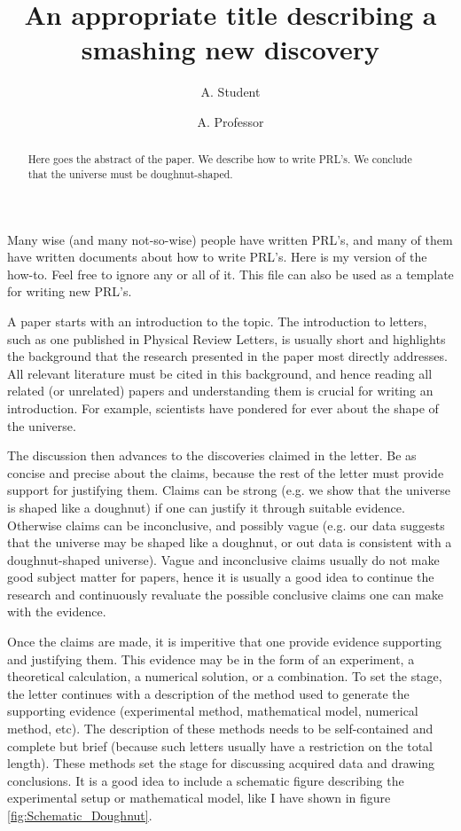 \documentclass[twocolumn,prl]{revtex4-1}
\begin{document}
\title{An appropriate title describing a smashing new discovery}
\author{A. Student}
\author{A. Professor}
\begin{abstract}
Here goes the abstract of the paper. We describe how to write PRL's. We conclude that the universe must be doughnut-shaped.
\end{abstract}
\maketitle

Many wise (and many not-so-wise) people have written PRL's, and many of them have written documents about how to write PRL's. Here is my version of the how-to. Feel free to ignore any or all of it. This file can also be used as a template for writing new PRL's.

A paper starts with an introduction to the topic. The introduction to letters, such as one published in Physical Review Letters, is usually short and highlights the background that the research presented in the paper most directly addresses. All relevant literature must be cited in this background, and hence reading all related (or unrelated) papers and understanding them is crucial for writing an introduction. For example, scientists have pondered for ever about the shape of the universe\cite{aurich2004can,ellis2003shape,adams2001shape,gomero2000signature,cornish1998can}.

The discussion then advances to the discoveries claimed in the letter. Be as concise and precise about the claims, because the rest of the letter must provide support for justifying them. Claims can be strong (e.g. we show that the universe is shaped like a doughnut) if one can justify it through suitable evidence. Otherwise claims can be inconclusive, and possibly vague (e.g. our data suggests that the universe may be shaped like a doughnut, or out data is consistent with a doughnut-shaped universe). Vague and inconclusive claims usually do not make good subject matter for papers, hence it is usually a good idea to continue the research and continuously revaluate the possible conclusive claims one can make with the evidence.

Once the claims are made, it is imperitive that one provide evidence supporting and justifying them. This evidence may be in the form of an experiment, a theoretical calculation, a numerical solution, or a combination. To set the stage, the letter continues with a description of the method used to generate the supporting evidence (experimental method, mathematical model, numerical method, etc). The description of these methods needs to be self-contained and complete but brief (because such letters usually have a restriction on the total length). These methods set the stage for discussing acquired data and drawing conclusions. It is a good idea to include a schematic figure describing the experimental setup or mathematical model, like I have shown in figure \ref{fig:Schematic_Doughnut}.
\end{document}
